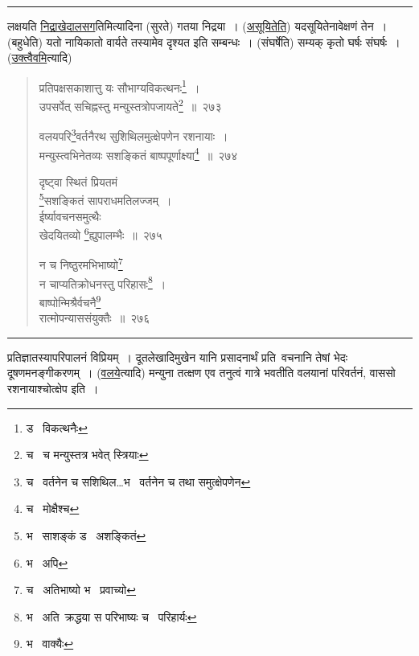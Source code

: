 \documentclass[11pt, openany]{book}
\begin{document}
\hrule

\vspace{2mm}
\noindent
लक्षयति \underline{निद्राखेदालसग}तिमित्यादिना (सुरते) गतया निद्रया~। (\underline{असूयितेति}) यदसूयितेनावेक्षणं तेन~। (बहुधेति) यतो नायिकातो वार्यते तस्यामेव दृश्यत इति सम्बन्धः~। (संघर्षेति) सम्यक् कृतो घर्षः संघर्षः~। (\underline{उक्त्वैवमि}त्यादि)

\newpage

\begin{quote}
{\na प्रतिपक्षसकाशात्तु यः सौभाग्यविकत्थनः\renewcommand{\thefootnote}{1}\footnote{ड \textendash\  विकत्थनैः}~।\\
उपसर्पेत् सचिह्नस्तु मन्युस्तत्रोपजायते\renewcommand{\thefootnote}{2}\footnote{च \textendash\  च मन्युस्तत्र भवेत् स्त्रियाः}~॥~२७३

वलयपरि\renewcommand{\thefootnote}{3}\footnote{च \textendash\  वर्तनेन च सशिथिल\ldots भ \textendash\  वर्तनेन च तथा समुत्क्षेपणेन}वर्तनैरथ सुशिथिलमुत्क्षेपणेन रशनायाः~।\\
मन्युस्त्वभिनेतव्यः सशङ्कितं बाष्पपूर्णाक्ष्या\renewcommand{\thefootnote}{4}\footnote{च \textendash\  मोक्षैश्च}~॥~२७४ 

दृष्ट्वा स्थितं प्रियतमं\\
\renewcommand{\thefootnote}{5}\footnote{भ \textendash\  साशङ्कं ड \textendash\  अशङ्कितं}सशङ्कितं सापराधमतिलज्जम्~। \\
ईर्ष्यावचनसमुत्थैः \\
 खेदयितव्यो \renewcommand{\thefootnote}{6}\footnote{भ \textendash\  अपि}ह्युपालम्भैः~॥~२७५

न च निष्ठुरमभिभाष्यो\renewcommand{\thefootnote}{7}\footnote{च \textendash\  अतिभाष्यो भ \textendash\  प्रवाच्यो} \\
 न चाप्यतिक्रोधनस्तु परिहासः\renewcommand{\thefootnote}{8}\footnote{भ \textendash\  अति\textendash\ क्रद्धया स परिभाष्यः च \textendash\  परिहार्यः}~।\\
बाष्पोन्मिश्रैर्वचनै\renewcommand{\thefootnote}{9}\footnote{भ \textendash\  वाक्यैः}\textendash \\
 रात्मोपन्याससंयुक्तैः~॥~२७६}
\end{quote}

\hrule

\vspace{2mm}
\noindent
प्रतिज्ञातस्यापरिपालनं विप्रियम्~। दूतलेखादिमुखेन यानि प्रसादनार्थं प्रति\textendash\ वचनानि तेषां भेदः दूषणमनङ्गीकरणम्~। (\underline{वलये}त्यादि) मन्युना तत्क्षण एव तनुत्वं गात्रे भवतीति वलयानां परिवर्तनं, वाससो रशनायाश्चोत्क्षेप इति~।\\
\end{document}
